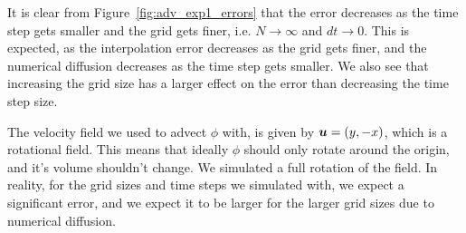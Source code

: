 \documentclass[acmtog]{acmart}
\begin{document}
It is clear from Figure~\ref{fig:adv_exp1_errors} that the error decreases as
the time step gets smaller and the grid gets finer, i.e. $N \to \infty$ and $dt
  \to 0$. This is expected, as the interpolation error decreases as the grid gets
finer, and the numerical diffusion decreases as the time step gets smaller. We
also see that increasing the grid size has a larger effect on the error than
decreasing the time step size.

The velocity field we used to advect $\phi$ with, is given by $\boldsymbol u =
  \qty(y, -x)$, which is a rotational field. This means that ideally $\phi$
should only rotate around the origin, and it's volume shouldn't change. We
simulated a full rotation of the field. In reality, for the grid sizes and time
steps we simulated with, we expect a significant error, and we expect it to be
larger for the larger grid sizes due to numerical diffusion.
\end{document}
